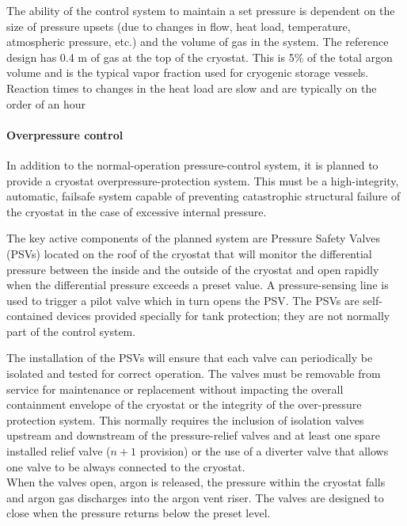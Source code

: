 The ability of the control system to maintain a set pressure is dependent on the size of pressure upsets (due to changes in flow, heat load, temperature, atmospheric pressure, etc.) and the volume of gas in the system. The reference design has 0.4 m of gas at the top of the cryostat. This is 5\% of the total argon volume and is the typical vapor fraction used for cryogenic storage vessels. Reaction times to changes in the heat load are slow and are typically on the order of an hour 

\paragraph{Overpressure control}

In addition to the normal-operation pressure-control system, it is planned to provide a cryostat overpressure-protection system. This must be a high-integrity, automatic, failsafe system capable of preventing catastrophic structural failure of the cryostat in the case of excessive internal pressure.

The key active components of the planned system are Pressure Safety Valves (PSVs) located on the roof of the cryostat that will monitor the differential pressure between the inside and the outside of the cryostat and open rapidly when the differential pressure exceeds a preset value. A pressure-sensing line is used to trigger a pilot valve which in turn opens the PSV. The PSVs are self-contained devices provided specially for tank protection; they are not normally part of the control system. 

The installation of the PSVs will ensure that each valve can periodically be isolated and tested for correct operation. The valves must be removable from service for maintenance or replacement without impacting the overall containment envelope of the cryostat or the integrity of the over-pressure protection system. This normally requires the inclusion of isolation valves upstream and downstream of the pressure-relief valves and at least one spare installed relief valve ($n + 1$ provision) or the use of a diverter valve that allows one valve to be always connected to the cryostat. \\
%
When the valves open, argon is released, the pressure within the cryostat falls and argon gas discharges into the argon vent riser. The valves are designed to close when the pressure returns below the preset level.

